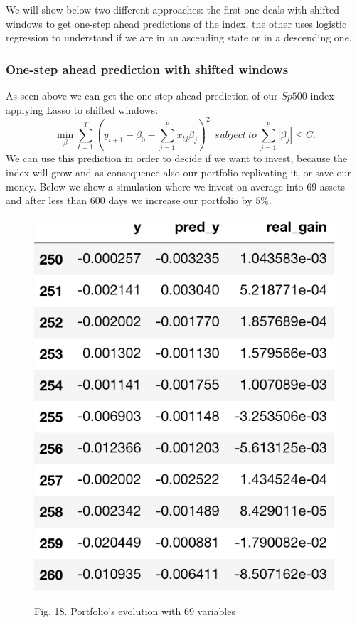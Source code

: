 \documentclass{article}%
\begin{document}
We will show below two different approaches: the first one deals with shifted windows to get one-step ahead predictions of the index, the other uses logistic regression to understand if we are in an ascending state or in a descending one. 

\subsubsection{One-step ahead prediction with shifted windows}
As seen above we can get the one-step ahead prediction of our $Sp500$ index applying Lasso to shifted windows:
\begin{equation}
 \min_{\beta} \sum_{t=1}^T ( y_{t+1} -\beta_0 -\sum_{j=1}^p x_{tj} \beta_j)^2 ~~subject~to~\sum_{j=1}^p |\beta_j| \leq C.
\end{equation}
We can use this prediction in order to decide if we want to invest, because the index will grow and as consequence also our portfolio replicating it, or save our money. Below we show a simulation where we invest on average into 69 assets and after 
less than 600 days we increase our portfolio by $5\%$. 
\newpage
  \begin{figure}[h!!!!!]
  \centering
  \includegraphics[scale=0.6]{act_port.png}
  \begin{center}
\begin{small}
Fig. 18. Portfolio's evolution with 69 variables

\end{small}
\end{center}
  
  \label{portfolio_alpha}
  \end{figure}
  
\end{document}
